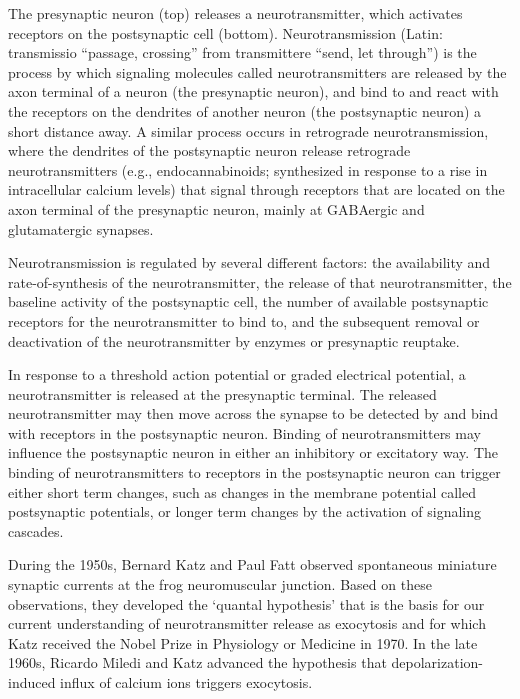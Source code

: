 The presynaptic neuron (top) releases a neurotransmitter, which activates receptors on the postsynaptic cell (bottom).
Neurotransmission (Latin: transmissio ``passage, crossing'' from transmittere ``send, let through'') is the process by which signaling molecules called neurotransmitters are released by the axon terminal of a neuron (the presynaptic neuron), and bind to and react with the receptors on the dendrites of another neuron (the postsynaptic neuron) a short distance away. A similar process occurs in retrograde neurotransmission, where the dendrites of the postsynaptic neuron release retrograde neurotransmitters (e.g., endocannabinoids; synthesized in response to a rise in intracellular calcium levels) that signal through receptors that are located on the axon terminal of the presynaptic neuron, mainly at GABAergic and glutamatergic synapses.

Neurotransmission is regulated by several different factors: the availability and rate-of-synthesis of the neurotransmitter, the release of that neurotransmitter, the baseline activity of the postsynaptic cell, the number of available postsynaptic receptors for the neurotransmitter to bind to, and the subsequent removal or deactivation of the neurotransmitter by enzymes or presynaptic reuptake.

In response to a threshold action potential or graded electrical potential, a neurotransmitter is released at the presynaptic terminal. The released neurotransmitter may then move across the synapse to be detected by and bind with receptors in the postsynaptic neuron. Binding of neurotransmitters may influence the postsynaptic neuron in either an inhibitory or excitatory way. The binding of neurotransmitters to receptors in the postsynaptic neuron can trigger either short term changes, such as changes in the membrane potential called postsynaptic potentials, or longer term changes by the activation of signaling cascades.

During the 1950s, Bernard Katz and Paul Fatt observed spontaneous miniature synaptic currents at the frog neuromuscular junction. Based on these observations, they developed the `quantal hypothesis' that is the basis for our current understanding of neurotransmitter release as exocytosis and for which Katz received the Nobel Prize in Physiology or Medicine in 1970. In the late 1960s, Ricardo Miledi and Katz advanced the hypothesis that depolarization-induced influx of calcium ions triggers exocytosis.

